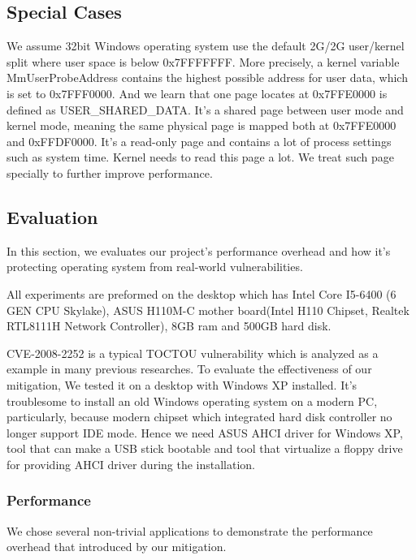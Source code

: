 \subsection{Special Cases}
We assume 32bit Windows operating system use the default 2G/2G user/kernel split where user space is below 0x7FFFFFFF. More precisely, a kernel variable MmUserProbeAddress contains the highest possible address for user data, which is set to 0x7FFF0000. And we learn that one page locates at 0x7FFE0000 is defined as USER\_SHARED\_DATA. It's a shared page between user mode and kernel mode, meaning the same physical page is mapped both at 0x7FFE0000 and 0xFFDF0000. It's a read-only page and contains a lot of process settings such as system time. Kernel needs to read this page a lot. We treat such page specially to further improve performance. 


\subsection{Evaluation}

In this section, we evaluates our project's performance overhead and how it's protecting operating system from real-world vulnerabilities.

All experiments are preformed on the desktop which has Intel Core I5-6400 (6 GEN CPU Skylake), ASUS H110M-C mother board(Intel H110 Chipset, Realtek RTL8111H Network Controller), 8GB ram and 500GB hard disk.

CVE-2008-2252 is a typical TOCTOU vulnerability which is analyzed as a example in many previous researches. To evaluate the effectiveness of our mitigation, We tested it on a desktop with Windows XP installed. It's troublesome to install an old Windows operating system on a modern PC, particularly, because modern chipset which integrated hard disk controller no longer support IDE mode. Hence we need ASUS AHCI driver for Windows XP, tool that can make a USB stick bootable and tool that virtualize a floppy drive~\cite{installxpskylake} for providing AHCI driver during the installation.

\subsubsection{Performance}

We chose several non-trivial applications to demonstrate the performance overhead that introduced by our mitigation. 

